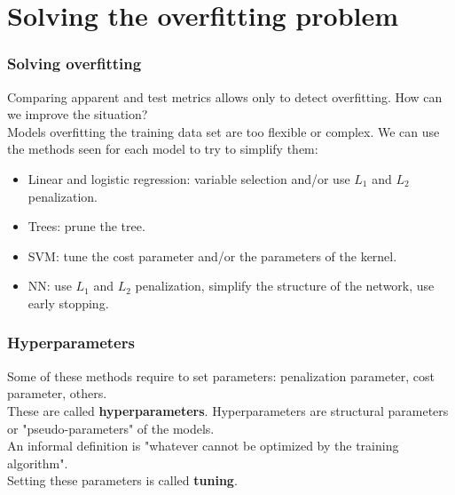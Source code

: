\section{Solving the overfitting problem}
\begin{frame}
\frametitle{Solving overfitting}
Comparing apparent and test metrics allows only to detect overfitting. How can we improve the situation?\\
\vspace{0.3cm}
Models overfitting the training data set are too flexible or complex. We can use the methods seen for each model to try to simplify them:
\begin{itemize}
\item Linear and logistic regression: variable selection and/or use $L_1$ and $L_2$ penalization.
\item Trees: prune the tree.
\item SVM: tune the cost parameter and/or the parameters of the kernel.
\item NN: use $L_1$ and $L_2$ penalization, simplify the structure of the network, use early stopping. 
\end{itemize}

\end{frame}
\begin{frame}
\frametitle{Hyperparameters}
Some of these methods require to set parameters: penalization parameter, cost parameter, others.\\ 
\vspace{0.3cm}
These are called {\bf hyperparameters}. Hyperparameters are structural parameters or "pseudo-parameters" of the models.\\
\vspace{0.3cm}
An informal definition is "whatever cannot be optimized by the training algorithm".\\
\vspace{0.3cm}
Setting these parameters is called {\bf tuning}.
\end{frame}
